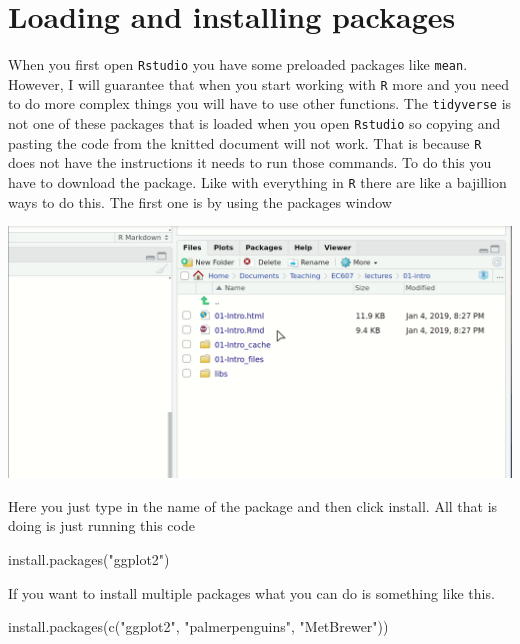 \documentclass[
  letterpaper,
  DIV=11,
  numbers=noendperiod,
  oneside]{scrreprt}
\newenvironment{Shaded}{\begin{snugshade}}{\end{snugshade}}
\newcommand{\FunctionTok}[1]{\textcolor[rgb]{0.28,0.35,0.67}{#1}}
\newcommand{\NormalTok}[1]{\textcolor[rgb]{0.00,0.23,0.31}{#1}}
\newcommand{\StringTok}[1]{\textcolor[rgb]{0.13,0.47,0.30}{#1}}
\begin{document}
\hypertarget{loading-and-installing-packages}{%
\section{Loading and installing
packages}\label{loading-and-installing-packages}}

When you first open \texttt{Rstudio} you have some preloaded packages
like \texttt{mean}. However, I will guarantee that when you start
working with \texttt{R} more and you need to do more complex things you
will have to use other functions. The \texttt{tidyverse} is not one of
these packages that is loaded when you open \texttt{Rstudio} so copying
and pasting the code from the knitted document will not work. That is
because \texttt{R} does not have the instructions it needs to run those
commands. To do this you have to download the package. Like with
everything in \texttt{R} there are like a bajillion ways to do this. The
first one is by using the packages window

\includegraphics{pics/install.gif}

Here you just type in the name of the package and then click install.
All that is doing is just running this code

\begin{Shaded}
\begin{Highlighting}[]
\FunctionTok{install.packages}\NormalTok{(}\StringTok{"ggplot2"}\NormalTok{)}
\end{Highlighting}
\end{Shaded}

If you want to install multiple packages what you can do is something
like this.

\begin{Shaded}
\begin{Highlighting}[]
\FunctionTok{install.packages}\NormalTok{(}\FunctionTok{c}\NormalTok{(}\StringTok{"ggplot2"}\NormalTok{, }\StringTok{"palmerpenguins"}\NormalTok{, }\StringTok{"MetBrewer"}\NormalTok{))}
\end{Highlighting}
\end{Shaded}
\end{document}
